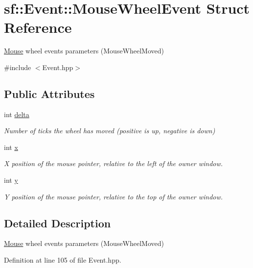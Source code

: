 \hypertarget{structsf_1_1_event_1_1_mouse_wheel_event}{\section{sf\-:\-:Event\-:\-:Mouse\-Wheel\-Event Struct Reference}
\label{structsf_1_1_event_1_1_mouse_wheel_event}
}


\hyperlink{classsf_1_1_mouse}{Mouse} wheel events parameters (Mouse\-Wheel\-Moved)  




{\ttfamily \#include $<$Event.\-hpp$>$}

\subsection*{Public Attributes}
\begin{DoxyCompactItemize}
\item 
int \hyperlink{structsf_1_1_event_1_1_mouse_wheel_event_a4d02b524b5530c7863e7b0f211fa522c}{delta}
\begin{DoxyCompactList}\small\item\em Number of ticks the wheel has moved (positive is up, negative is down) \end{DoxyCompactList}\item 
int \hyperlink{structsf_1_1_event_1_1_mouse_wheel_event_a3079803f836ed7208f43b60332ab053e}{x}
\begin{DoxyCompactList}\small\item\em X position of the mouse pointer, relative to the left of the owner window. \end{DoxyCompactList}\item 
int \hyperlink{structsf_1_1_event_1_1_mouse_wheel_event_a7ea1b8d8c28e2f530c6e9e6d9a5d32d3}{y}
\begin{DoxyCompactList}\small\item\em Y position of the mouse pointer, relative to the top of the owner window. \end{DoxyCompactList}\end{DoxyCompactItemize}


\subsection{Detailed Description}
\hyperlink{classsf_1_1_mouse}{Mouse} wheel events parameters (Mouse\-Wheel\-Moved) 

Definition at line 105 of file Event.\-hpp.



